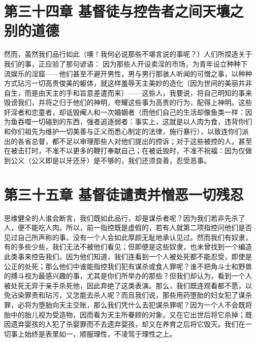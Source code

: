 
\section{第三十四章 基督徒与控告者之间天壤之别的道德}

然而，虽然我们品行如此（噢！我何必说那些不堪言说的事呢？）人们所捏造关于我们的事，正应验了那句谚语： 因为那些人开设卖淫的市场，为青年设立种种下流娱乐的淫窟——他们甚至不避开男性，男与男行那骇人听闻的可憎之事，以种种方式玷污一切高贵俊美的躯体，就这样羞辱天主美妙的造化（因为世间的美丽并非自生，而是由天主的手和旨意差遣而来）——这些人，我要说，将自己明知的事来毁谤我们，并将之归于他们的神明，夸耀这些事为高贵的行为，配得上神明。这些奸淫者和恋童者，却诋毁阉人和一次婚姻者（而他们自己的生活却像鱼类一样：因为鱼吞噬一切碰到的东西，强者追逐弱者：事实上，这就是以人肉为食，违背你们和你们祖先为维护一切美善与正义而悉心制定的法律，施行暴行），以致连你们派出的各省总督，都不足以审理那些人对他们提出的控诉；对于这些被控的人，甚至在被击打时，不准不以更多的鞭打奉献自己；在被诋毁时，不准不祝福：因为仅做到公义（公义即是以牙还牙）是不够的，我们还须良善，忍受恶事。\par


\section{第三十五章 基督徒谴责并憎恶一切残忍}

思维健全的人谁会断言，我们既如此品行，却是谋杀者呢？因为我们若非先杀了人，便不能吃人肉。所以，前一指控既是虚假的，若有人就第二项指控问他们是否见过自己所声称的事，没有一个人会如此厚颜无耻地承认见过。然而我们有奴隶，有的多些少些，我们无法不被他们看见；但即便是这些奴隶，也未曾找到一个编造此类事来控告我们。因为他们知道，我们连看到一个人被处死都不能忍受，即使是公正的处死；那么他们中谁能指控我们犯有谋杀或食人罪呢？谁不把角斗士和野兽的搏斗视为最感兴趣的事，尤其是你们所举办的那些？但我们却认为，看到一个人被处死无异于亲手杀死他，因此弃绝了这类表演。那么，我们既连观看都不愿，以免沾染罪责和玷污，又怎能去杀人呢？而且我们说，那些用药堕胎的妇女犯了谋杀罪，必将为堕胎向天主交账，那么我们凭什么去犯谋杀罪呢？因为一个人不会既将胎中的胎儿视为受造物，因而看为天主所眷顾的对象，又在它出世后将它杀掉；既因遗弃婴孩的人犯了杀婴罪而不去遗弃婴孩，却又在养育之后将它毁灭。我们在一切事上始终是表里如一，顺服理性，不凌驾于理性之上。\par

